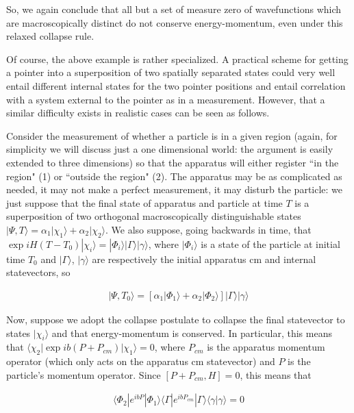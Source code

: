 \documentclass{article}
\begin{document}
	So, we again conclude that all but a set of measure zero of 
wavefunctions which are macroscopically distinct do not conserve energy-momentum, 
even under this relaxed collapse rule. 

	Of course, the above example is rather specialized.  A practical 
scheme for getting a pointer into a superposition of two spatially separated states could very well entail 
different internal states for the two pointer positions and entail correlation with a system 
external to the pointer as in a measurement.  However, that a similar difficulty exists 
in realistic cases can be seen as follows\cite{Goldberg}.

	Consider the measurement of whether a particle is in a given region (again, for simplicity we will discuss 
just a one dimensional world: the argument is easily extended to three dimensions) so that the apparatus 
will either register ``in the region" (1) or ``outside the region" (2).  The apparatus may be as 
complicated as needed, it may not make a perfect measurement, it may disturb the particle: 
we just suppose that the final state of apparatus and particle at time $T$ is a superposition of two orthogonal 
macroscopically distinguishable states
$|\Psi,T\rangle = \alpha_{1}|\chi_{1}\rangle+\alpha_{2}|\chi_{2}\rangle$. We also suppose, going backwards 
in time, that $\exp iH(T-T_{0})|\chi_{i}\rangle=|\Phi_{i}\rangle|\Gamma\rangle|\gamma\rangle$, where 
$|\Phi_{i}\rangle$ is a state of the particle at initial time $T_{0}$ and $|\Gamma\rangle$, $|\gamma\rangle$ are 
respectively the initial apparatus cm and internal statevectors, so 
 
\begin{eqnarray*}
|\Psi, T_{0}\rangle=[\alpha_{1}|\Phi_{1}\rangle+\alpha_{2}|\Phi_{2}\rangle]|\Gamma\rangle|\gamma\rangle
\end{eqnarray*}

	Now, suppose we adopt the collapse postulate to 
collapse the final statevector to states $|\chi_{i}\rangle$ and that 
energy-momentum is conserved. In particular, this means that 
$\langle \chi_{2}|\exp ib(P+P_{cm})|\chi_{1}\rangle=0$, where $P_{cm}$ is the apparatus 
momentum operator (which only acts on the apparatus cm statevector) and $P$ is the particle's 
momentum operator.  Since $[P+P_{cm},H]=0$, this means that 

\begin{eqnarray*}
\langle\Phi_{2}| e^{ibP}|\Phi_{1}\rangle\langle\Gamma| e^{ibP_{cm}}|\Gamma\rangle
\langle\gamma|\gamma\rangle=0
\end{eqnarray*} 
\end{document}
